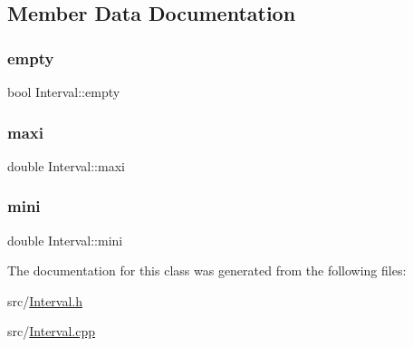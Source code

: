 \subsection{Member Data Documentation}
\mbox{\label{classInterval_a9d9385e1ce6637e5760d26bf80aeada6}} 
\subsubsection{\texorpdfstring{empty}{empty}}
{\footnotesize\ttfamily bool Interval\+::empty\hspace{0.3cm}{\ttfamily [private]}}

\mbox{\label{classInterval_ac086c91ab2c6f75ce8b3ff3818b38798}} 
\subsubsection{\texorpdfstring{maxi}{maxi}}
{\footnotesize\ttfamily double Interval\+::maxi\hspace{0.3cm}{\ttfamily [private]}}

\mbox{\label{classInterval_aeb6ee750751e32a0f92d23f0a44ab122}} 
\subsubsection{\texorpdfstring{mini}{mini}}
{\footnotesize\ttfamily double Interval\+::mini\hspace{0.3cm}{\ttfamily [private]}}



The documentation for this class was generated from the following files\+:\begin{DoxyCompactItemize}
\item 
src/\mbox{\hyperlink{Interval_8h}{Interval.\+h}}\item 
src/\mbox{\hyperlink{Interval_8cpp}{Interval.\+cpp}}\end{DoxyCompactItemize}
